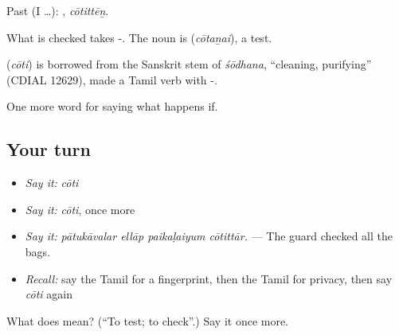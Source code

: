 Past (I …): , \emph{cōtittēṉ}.

What is checked takes -. The noun is  (\emph{cōtaṉai}), a test.

\begin{cousinweb}
\textbf{} (\emph{cōti}) is borrowed from the Sanskrit stem of \emph{śōdhana}, \textquotedblleft{}cleaning, purifying\textquotedblright{} (CDIAL 12629), made a Tamil verb with -.
\end{cousinweb}

\begin{grammarlens}[title={What you've built}]
One more word for saying what happens if.
\end{grammarlens}

\subsection*{Your turn}
\begin{itemize}
\raggedright
  \item \emph{Say it:} \emph{cōti}
  \item \emph{Say it:} \emph{cōti}, once more
  \item \emph{Say it:} \emph{pātukāvalar ellāp paikaḷaiyum cōtittār.} — The guard checked all the bags.
  \item \emph{Recall:} say the Tamil for a fingerprint, then the Tamil for privacy, then say \emph{cōti} again
\end{itemize}

\begin{tcolorbox}[breakable,colback=teal!4,colframe=teal!35!black,title={Before you move on}]
What does  mean? (\textquotedblleft{}To test; to check\textquotedblright{}.) Say it once more.
\end{tcolorbox}
